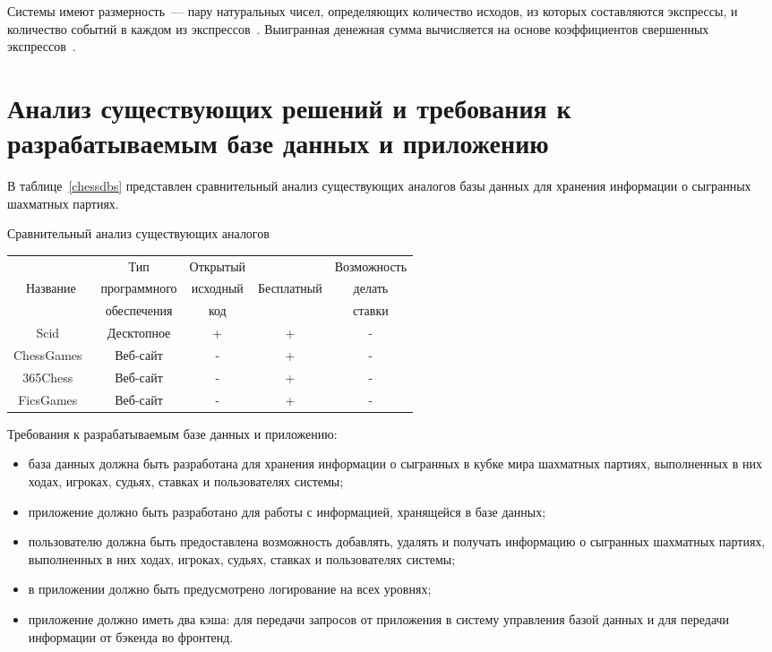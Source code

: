 Системы имеют размерность~--- пару натуральных чисел, определяющих количество исходов, из которых составляются экспрессы, и количество событий в каждом из экспрессов~\cite{bet}.
Выигранная денежная сумма вычисляется на основе коэффициентов свершенных экспрессов~\cite{bet}.

\section[Анализ существующих решений и требования к разрабатываемым базе данных и приложению]{Анализ существующих решений и требования к\\разрабатываемым базе данных и приложению}

В таблице~\ref{chessdbs} представлен сравнительный анализ существующих аналогов базы данных для хранения информации о сыгранных шахматных партиях.
\begin{center}
	\begin{threeparttable}
		\captionsetup{justification=raggedright,singlelinecheck=off}
		\caption{\label{chessdbs}Сравнительный анализ существующих аналогов}
		\centering
		\begin{tabular}{|c|c|c|c|c|}
			\hline
			& Тип & Открытый && Возможность\\
			Название & программного & исходный &  Бесплатный & делать\\
			& обеспечения & код && ставки\\
			\hline
			Scid~\cite{scid} & Десктопное & + & + & -\\
			\hline
			ChessGames~\cite{chessgamescom} & Веб-сайт & - & + & -\\
			\hline
			365Chess~\cite{365chess} & Веб-сайт & - & + & -\\
			\hline
			FicsGames~\cite{fics} & Веб-сайт & - & + & -\\
			\hline
		\end{tabular}
	\end{threeparttable}
\end{center}

Требования к разрабатываемым базе данных и приложению:
\begin{itemize}
	\item база данных должна быть разработана для хранения информации о сыгранных в кубке мира шахматных партиях, выполненных в них ходах, игроках, судьях, ставках и пользователях системы;
	\item приложение должно быть разработано для работы с информацией, хранящейся в базе данных;
	\item пользователю должна быть предоставлена возможность добавлять, удалять и получать информацию о сыгранных шахматных партиях, выполненных в них ходах, игроках, судьях, ставках и пользователях системы;
	\item в приложении должно быть предусмотрено логирование на всех уровнях;
	\item приложение должно иметь два кэша: для передачи запросов от приложения в систему управления базой данных и для передачи информации от бэкенда во фронтенд.
\end{itemize}

